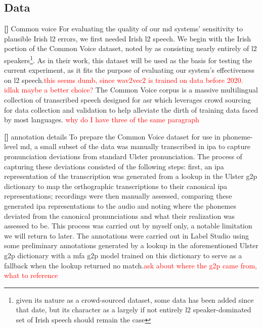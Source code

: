 \documentclass[thesis]{cluu}
\newcounter{paranum}
\newcommand{\numberedparagraph}{\par\refstepcounter{paranum}\textbf{[\theparanum] }}
\newcommand{\todo}[1]{\textcolor{red}{#1}}
\begin{document}
\subsection{Data}
\numberedparagraph{Common voice}
For evaluating the quality of our \gls{md} systems' sensitivity to plausible Irish \gls{l2} errors, we first needed Irish \gls{l2} speech. We begin with the Irish portion of the Common Voice dataset\textcite{ardilaCommonVoiceMassivelyMultilingual2020}, noted by \textcite{lonerganAutomaticSpeechRecognition} as consisting nearly entirely of \gls{l2} speakers\footnote{given its nature as a crowd-sourced dataset, some data has been added since that date, but its character as a largely if not entirely \gls{l2} speaker-dominated set of Irish speech should remain the case}. As in their work, this dataset will be used as the basis for testing the current experiment, as it fits the purpose of evaluating our system's effectiveness on \gls{l2} speech.\todo{this seems dumb, since wav2vec2 is trained on data before 2020. idlak maybe a better choice?} The Common Voice corpus is a massive multilingual collection of transcribed speech designed for \gls{asr} which leverages crowd sourcing for data collection and validation to help alleviate the dirth of training data faced by most languages. \todo{why do I have three of the same paragraph}

\numberedparagraph{annotation details} 
To prepare the Common Voice dataset for use in phoneme-level \gls{md}, a small subset of the data was manually transcribed in \gls{ipa} to capture pronunciation deviations from standard Ulster pronunciation. The process of capturing these deviations consisted of the following steps: first, an \gls{ipa} representation of the transcription was generated from a lookup in the Ulster \gls{g2p} dictionary to map the orthographic transcriptions to their canonical \gls{ipa} representations; recordings were then manually assessed, comparing these generated \gls{ipa} representations to the audio and noting where the phonemes deviated from the canonical pronunciations and what their realization was assessed to be. This process was carried out by myself only, a notable limitation we will return to later. The annotations were carried out in Label Studio using some preliminary annotations generated by a lookup in the aforementioned Ulster \gls{g2p} dictionary with a \gls{mfa} \gls{g2p} model trained on this dictionary to serve as a fallback when the lookup returned no match.\todo{ask about where the g2p came from, what to reference} 
\end{document}
